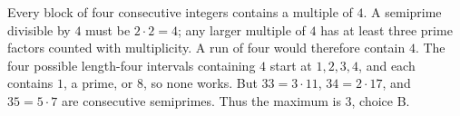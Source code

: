 Every block of four consecutive integers contains a multiple of $4$. A semiprime divisible by $4$ must be $2\cdot 2=4$; any larger multiple of $4$ has at least three prime factors counted with multiplicity. A run of four would therefore contain $4$. The four possible length-four intervals containing $4$ start at $1,2,3,4$, and each contains $1$, a prime, or $8$, so none works. But $33=3\cdot 11$, $34=2\cdot 17$, and $35=5\cdot 7$ are consecutive semiprimes. Thus the maximum is $\boxed 3$, choice B.
